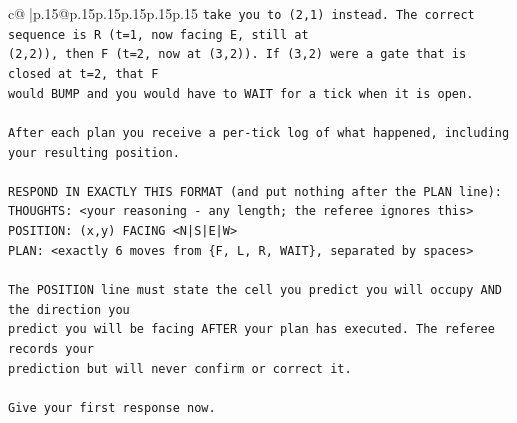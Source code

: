 \documentclass{article}
\begin{document}
{\begin{supertabular}{c@{$\;$}|p{.15\linewidth}@{}p{.15\linewidth}p{.15\linewidth}p{.15\linewidth}p{.15\linewidth}p{.15\linewidth}}
{{{\texttt{take you to (2,1) instead. The correct sequence is R (t=1, now facing E, still at} \\
\texttt{(2,2)), then F (t=2, now at (3,2)). If (3,2) were a gate that is closed at t=2, that F} \\
\texttt{would BUMP and you would have to WAIT for a tick when it is open.} \\
\\ 
\texttt{After each plan you receive a per{-}tick log of what happened, including your resulting position.} \\
\\ 
\texttt{RESPOND IN EXACTLY THIS FORMAT (and put nothing after the PLAN line):} \\
\texttt{THOUGHTS: <your reasoning {-} any length; the referee ignores this>} \\
\texttt{POSITION: (x,y) FACING <N|S|E|W>} \\
\texttt{PLAN: <exactly 6 moves from \{F, L, R, WAIT\}, separated by spaces>} \\
\\ 
\texttt{The POSITION line must state the cell you predict you will occupy AND the direction you} \\
\texttt{predict you will be facing AFTER your plan has executed. The referee records your} \\
\texttt{prediction but will never confirm or correct it.} \\
\\ 
\texttt{Give your first response now.} \\
            }
        }
    }
     \\ \\


\end{supertabular}}
\end{document}
